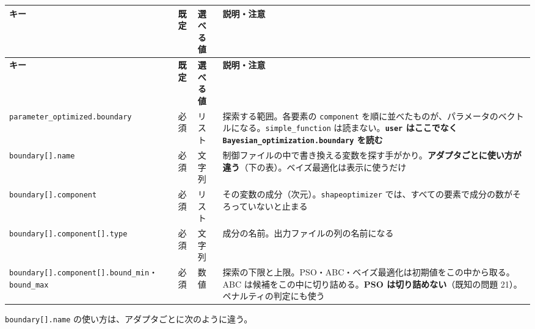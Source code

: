 \begingroup\small
\begin{longtable}{>{\raggedright\arraybackslash}p{}>{\raggedright\arraybackslash}p{}>{\raggedright\arraybackslash}p{}>{\raggedright\arraybackslash}p{}}
\toprule
\textbf{キー} & \textbf{既定} & \textbf{選べる値} & \textbf{説明・注意} \\
\midrule
\endfirsthead
\toprule
\textbf{キー} & \textbf{既定} & \textbf{選べる値} & \textbf{説明・注意} \\
\midrule
\endhead
\bottomrule
\endlastfoot
\texttt{parameter\_\allowbreak{}optimized.\allowbreak{}boundary} & 必須 & リスト & 探索する範囲。各要素の \texttt{component} を順に並べたものが、パラメータのベクトルになる。\texttt{simple\_\allowbreak{}function} は読まない。\textbf{\texttt{user} はここでなく \texttt{Bayesian\_\allowbreak{}optimization.\allowbreak{}boundary} を読む} \\
\texttt{boundary[]\allowbreak{}.\allowbreak{}name} & 必須 & 文字列 & 制御ファイルの中で書き換える変数を探す手がかり。\textbf{アダプタごとに使い方が違う}（下の表）。ベイズ最適化は表示に使うだけ \\
\texttt{boundary[]\allowbreak{}.\allowbreak{}component} & 必須 & リスト & その変数の成分（次元）。\texttt{shapeoptimizer} では、すべての要素で成分の数がそろっていないと止まる \\
\texttt{boundary[]\allowbreak{}.\allowbreak{}component[]\allowbreak{}.\allowbreak{}type} & 必須 & 文字列 & 成分の名前。出力ファイルの列の名前になる \\
\texttt{boundary[]\allowbreak{}.\allowbreak{}component[]\allowbreak{}.\allowbreak{}bound\_\allowbreak{}min}・\texttt{bound\_\allowbreak{}max} & 必須 & 数値 & 探索の下限と上限。PSO・ABC・ベイズ最適化は初期値をこの中から取る。ABC は候補をこの中に切り詰める。\textbf{PSO は切り詰めない}（既知の問題 21）。ペナルティの判定にも使う \\
\end{longtable}
\endgroup

\texttt{boundary[]\allowbreak{}.\allowbreak{}name} の使い方は、アダプタごとに次のように違う。


